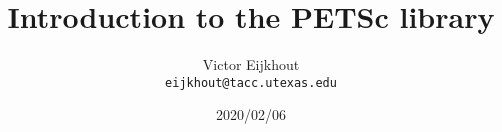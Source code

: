 \documentclass[11pt]{beamer}
\begin{document}
\title{Introduction to the PETSc library}
\author{Victor Eijkhout\\
\tt\normalsize eijkhout@tacc.utexas.edu}
\date{2020/02/06}
\frame{\titlepage}


\begin{xsede}
  
\end{xsede}











\begin{longversion}
  
  
\end{longversion}


\end{document}

